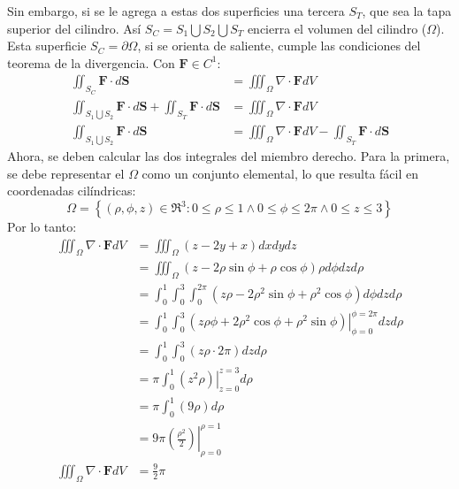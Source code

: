 \begin{solution}
    Sin embargo, si se le agrega a estas dos superficies una tercera $S_T$, que sea la tapa superior del cilindro.
    Así $S_C = S_1 \bigcup S_2 \bigcup S_T$ encierra el volumen del cilindro ($\Omega$). Esta superficie $S_C = \partial\Omega$, si se
    orienta de saliente, cumple las condiciones del teorema de la divergencia. Con $\boldsymbol{F} \in C^1$:
    \begin{align*}
        \iint_{S_C} \boldsymbol{F} \cdot d\boldsymbol{S} &= \iiint_{\Omega} \nabla \cdot \boldsymbol{F} dV\\
        \iint_{S_1 \bigcup S_2} \boldsymbol{F} \cdot d\boldsymbol{S} + \iint_{S_T} \boldsymbol{F} \cdot d\boldsymbol{S}&= \iiint_{\Omega} \nabla \cdot \boldsymbol{F} dV\\
        \iint_{S_1 \bigcup S_2} \boldsymbol{F} \cdot d\boldsymbol{S} &= \iiint_{\Omega} \nabla \cdot \boldsymbol{F} dV - \iint_{S_T} \boldsymbol{F} \cdot d\boldsymbol{S}
    \end{align*}
    Ahora, se deben calcular las dos integrales del miembro derecho. Para la primera, se debe representar el $\Omega$ 
    como un conjunto elemental, lo que resulta fácil en coordenadas cilíndricas:
    \begin{equation*}
    \Omega = \left\{(\rho,\phi,z) \in \Re^3: 0\leq\rho\leq1 \land 0\leq\phi\leq2\pi \land 0\leq z \leq 3 \right\}
    \end{equation*}
    Por lo tanto:
    \begin{align*}
        \iiint_{\Omega} \nabla \cdot \boldsymbol{F} dV &= \iiint_{\Omega} \left(z-2y+x\right)dxdydz\\
        &=\iiint_{\Omega} \left(z-2\rho\sin{\phi}+\rho\cos{\phi}\right)\rho d\phi dz d\rho\\
        &=\int_{0}^{1} \int_{0}^{3} \int_{0}^{2\pi} \left(z\rho-2\rho^2\sin{\phi}+\rho^2\cos{\phi}\right) d\phi dz d\rho\\
        &= \int_{0}^{1} \int_{0}^{3}  \left.\left(z\rho\phi+2\rho^2\cos{\phi}+\rho^2\sin{\phi}\right)\right|_{\phi=0}^{\phi=2\pi} dz d\rho\\
        &= \int_{0}^{1} \int_{0}^{3}  \left(z\rho\cdot2\pi\right) dz d\rho\\
        &= \pi\int_{0}^{1}  \left.\left(z^2\rho\right)\right|_{z=0}^{z=3} d\rho\\
        &= \pi\int_{0}^{1}  \left(9\rho\right) d\rho\\
        &= 9\pi \left.\left(\frac{\rho^2}{2}\right)\right|_{\rho=0}^{\rho=1}\\
        \iiint_{\Omega} \nabla \cdot \boldsymbol{F} dV&= \frac{9}{2}\pi

\end{align*}
\end{solution}
